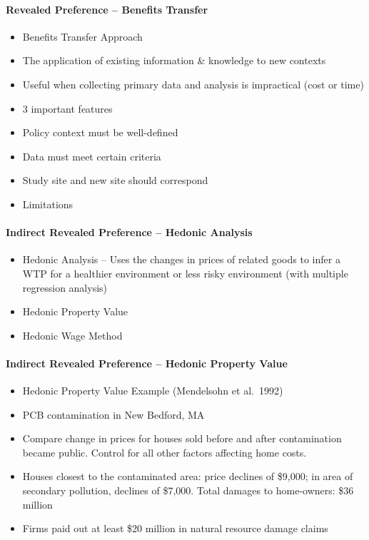 \documentclass[]{article}
\providecommand{\tightlist}{%
  \setlength{\itemsep}{0pt}\setlength{\parskip}{0pt}}
\let\oldparagraph\paragraph
\renewcommand{\paragraph}[1]{\oldparagraph{#1}\mbox{}}
\begin{document}
\hypertarget{revealed-preference-benefits-transfer}{%
\paragraph{Revealed Preference -- Benefits
Transfer}\label{revealed-preference-benefits-transfer}}

\begin{itemize}
\tightlist
\item
  Benefits Transfer Approach
\item
  The application of existing information \& knowledge to new contexts
\item
  Useful when collecting primary data and analysis is impractical (cost
  or time)
\item
  3 important features
\item
  Policy context must be well-defined
\item
  Data must meet certain criteria
\item
  Study site and new site should correspond
\item
  Limitations
\end{itemize}

\hypertarget{indirect-revealed-preference-hedonic-analysis}{%
\paragraph{Indirect Revealed Preference -- Hedonic
Analysis}\label{indirect-revealed-preference-hedonic-analysis}}

\begin{itemize}
\tightlist
\item
  Hedonic Analysis -- Uses the changes in prices of related goods to
  infer a WTP for a healthier environment or less risky environment
  (with multiple regression analysis)
\item
  Hedonic Property Value
\item
  Hedonic Wage Method
\end{itemize}

\hypertarget{indirect-revealed-preference-hedonic-property-value}{%
\paragraph{Indirect Revealed Preference -- Hedonic Property
Value}\label{indirect-revealed-preference-hedonic-property-value}}

\begin{itemize}
\tightlist
\item
  Hedonic Property Value Example (Mendelsohn et al.~1992)
\item
  PCB contamination in New Bedford, MA
\item
  Compare change in prices for houses sold before and after
  contamination became public. Control for all other factors affecting
  home costs.
\item
  Houses closest to the contaminated area: price declines of \$9,000; in
  area of secondary pollution, declines of \$7,000. Total damages to
  home-owners: \$36 million
\item
  Firms paid out at least \$20 million in natural resource damage claims
\end{itemize}
\end{document}
